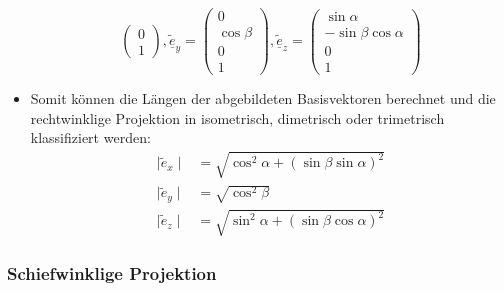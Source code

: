 \documentclass{scrartcl}
\begin{document}
\begin{itemize}
\begin{equation}
\begin{pmatrix}
		0 \\
		1
		\end{pmatrix}, \underline{\widetilde{e}}_y = \begin{pmatrix}
		0 \\
		\cos \beta \\
		0 \\
		1
		\end{pmatrix}, \underline{\widetilde{e}}_z = \begin{pmatrix}
		\sin \alpha \\
		-\sin \beta \cos \alpha \\
		0 \\
		1
		\end{pmatrix}
	\end{equation}
	\item Somit können die Längen der abgebildeten Basisvektoren berechnet und die rechtwinklige Projektion in isometrisch, dimetrisch oder trimetrisch klassifiziert werden:
	\begin{equation}
		\begin{split}
			\mid \widetilde{e}_x \mid &= \sqrt{\cos^2 \alpha + (\sin \beta \sin \alpha)^2} \\
			\mid \widetilde{e}_y \mid &= \sqrt{\cos^2 \beta} \\
			\mid \widetilde{e}_z \mid &= \sqrt{\sin^2 \alpha + (\sin \beta \cos \alpha)^2}
		\end{split}
	\end{equation}
\end{itemize}

\subsubsection{Schiefwinklige Projektion}
\end{document}
